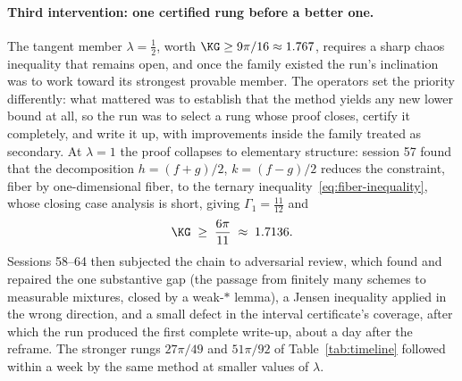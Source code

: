 \paragraph{Third intervention: one certified rung before a better one.}
The tangent member $\lambda=\tfrac12$, worth $\KG\ge9\pi/16\approx1.767$,
requires a sharp chaos inequality that remains open, and once the family
existed the run's inclination was to work toward its strongest provable
member. The operators set the priority differently: what mattered was to
establish that the method yields any new lower bound at all, so the run was
to select a rung whose proof closes, certify it completely, and write it up,
with improvements inside the family treated as secondary. At $\lambda=1$ the
proof collapses to elementary structure: session 57 found that the
decomposition $h=(f+g)/2$, $k=(f-g)/2$ reduces the constraint, fiber by
one-dimensional fiber, to the ternary inequality~\eqref{eq:fiber-inequality},
whose closing case analysis is short, giving $\Gamma_1=\tfrac{11}{12}$ and
\[
        \KG\;\ge\;\frac{6\pi}{11}\;\approx\;1.7136 .
\]
Sessions 58--64 then subjected the chain to adversarial review, which
found and repaired the one substantive gap (the passage from finitely many
schemes to measurable mixtures, closed by a weak-$*$ lemma), a Jensen
inequality applied in the wrong direction, and a small defect in the
interval certificate's coverage, after which the run produced the first
complete write-up, about a day after the reframe. The stronger rungs
$27\pi/49$ and $51\pi/92$ of Table~\ref{tab:timeline} followed within a week
by the same method at smaller values of $\lambda$.
